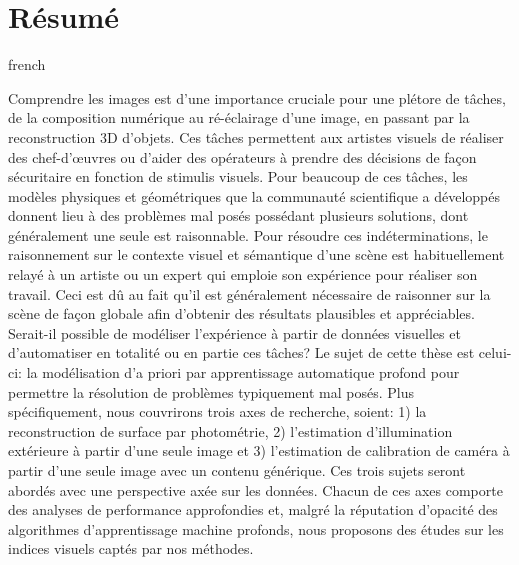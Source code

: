 \chapter*{Résumé}                      %

\begin{otherlanguage*}{french}

Comprendre les images est d'une importance cruciale pour une plétore de tâches, de la composition numérique au ré-éclairage d'une image, en passant par la reconstruction 3D d'objets. Ces tâches permettent aux artistes visuels de réaliser des chef-d'\oe{}uvres ou d'aider des opérateurs à prendre des décisions de façon sécuritaire en fonction de stimulis visuels. Pour beaucoup de ces tâches, les modèles physiques et géométriques que la communauté scientifique a développés donnent lieu à des problèmes mal posés possédant plusieurs solutions, dont généralement une seule est raisonnable. Pour résoudre ces indéterminations, le raisonnement sur le contexte visuel et sémantique d'une scène est habituellement relayé à un artiste ou un expert qui emploie son expérience pour réaliser son travail. Ceci est dû au fait qu'il est généralement nécessaire de raisonner sur la scène de façon globale afin d'obtenir des résultats plausibles et appréciables. Serait-il possible de modéliser l'expérience à partir de données visuelles et d'automatiser en totalité ou en partie ces tâches? Le sujet de cette thèse est celui-ci: la modélisation d'a priori par apprentissage automatique profond pour permettre la résolution de problèmes typiquement mal posés. Plus spécifiquement, nous couvrirons trois axes de recherche, soient: 1) la reconstruction de surface par photométrie, 2) l'estimation d'illumination extérieure à partir d'une seule image et 3) l'estimation de calibration de caméra à partir d'une seule image avec un contenu générique. Ces trois sujets seront abordés avec une perspective axée sur les données. Chacun de ces axes comporte des analyses de performance approfondies et, malgré la réputation d'opacité des algorithmes d'apprentissage machine profonds, nous proposons des études sur les indices visuels captés par nos méthodes. 

\end{otherlanguage*}
